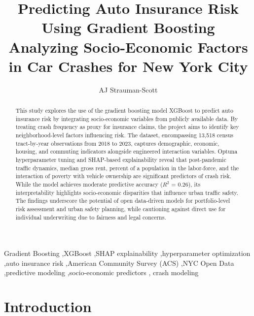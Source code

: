 \documentclass[
  number,
  review,
  3p]{elsarticle}
\begin{document}
\begin{frontmatter}
\title{Predicting Auto Insurance Risk Using Gradient
Boosting \\\large{Analyzing Socio-Economic Factors in Car Crashes for
New York City} }
\author[1]{AJ Strauman-Scott%
%
}



        
\begin{abstract}
This study explores the use of the gradient boosting model XGBoost to
predict auto insurance risk by integrating socio-economic variables from
publicly available data. By treating crash frequency as proxy for
insurance claims, the project aims to identify key neighborhood-level
factors influencing risk. The dataset, encompassing 13,518 census
tract-by-year observations from 2018 to 2023, captures demographic,
economic, housing, and commuting indicators alongside engineered
interaction variables. Optuna hyperparameter tuning and SHAP-based
explainability reveal that post-pandemic traffic dynamics, median gross
rent, percent of a population in the labor-force, and the interaction of
poverty with vehicle ownership are significant predictors of crash risk.
While the model achieves moderate predictive accuracy (\(R^2\) = 0.26),
its interpretability highlights socio-economic disparities that
influence urban traffic safety. The findings underscore the potential of
open data-driven models for portfolio-level risk assessment and urban
safety planning, while cautioning against direct use for individual
underwriting due to fairness and legal concerns.
\end{abstract}





\begin{keyword}
    Gradient Boosting \sep XGBoost \sep SHAP
explainability \sep hyperparameter optimization \sep auto insurance
risk \sep American Community Survey (ACS) \sep NYC Open
Data \sep predictive modeling \sep socio-economic predictors \sep 
    crash modeling
\end{keyword}
\end{frontmatter}
    

\section{Introduction}\label{sec-intro}
\end{document}
